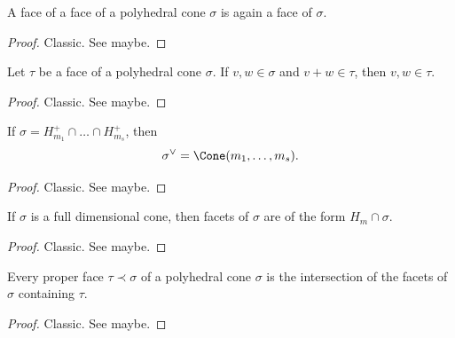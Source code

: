 \begin{lemma}
  \label{1-2-6-face-face}

  A face of a face of a polyhedral cone $\sigma$ is again a face of $\sigma$.
\end{lemma}
\begin{proof}

  Classic. See \cite{Oda_1988} maybe.
\end{proof}


\begin{lemma}
  \label{1-2-7-face-mem-of-add}

  Let $\tau$ be a face of a polyhedral cone $\sigma$. If $v, w \in \sigma$ and $v + w \in \tau$, then $v, w \in \tau$.
\end{lemma}
\begin{proof}

  Classic. See \cite{Oda_1988} maybe.
\end{proof}


\begin{proposition}
  \label{1-2-8-dual-cone-inter-halfspaces}

  If $\sigma = H_{m_1}^+ \cap \dots \cap H_{m_s}^+$, then
  $$\sigma^\vee = \Cone(m_1, \dots, m_s).$$
\end{proposition}
\begin{proof}

  Classic. See \cite{Oda_1988} maybe.
\end{proof}


\begin{proposition}
  \label{1-2-8-facet-full-dim-cone}

  If $\sigma$ is a full dimensional cone, then facets of $\sigma$ are of the form $H_m \cap \sigma$.
\end{proposition}
\begin{proof}

  Classic. See \cite{Oda_1988} maybe.
\end{proof}


\begin{proposition}
  \label{1-2-8-inter-facet}

  Every proper face $\tau \prec \sigma$ of a polyhedral cone $\sigma$ is the intersection of the facets of $\sigma$ containing $\tau$.
\end{proposition}
\begin{proof}

  Classic. See \cite{Oda_1988} maybe.
\end{proof}


